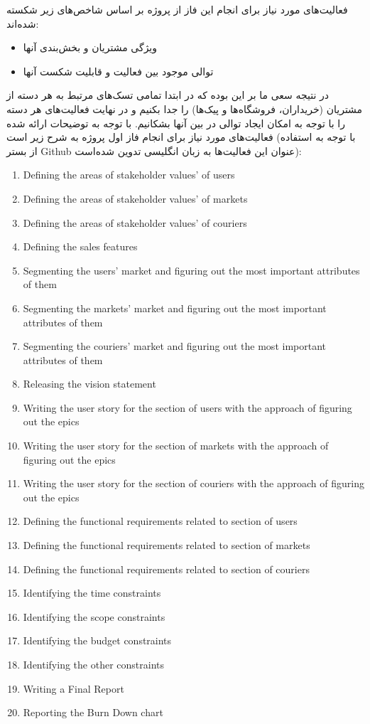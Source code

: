 \documentclass[]{article}
\begin{document}
فعالیت‌های مورد نیاز برای انجام این فاز از پروژه بر اساس شاخص‌های زیر
شکسته شده‌اند:

\begin{itemize}
\item
  ویژگی مشتریان و بخش‌بندی آنها
\item
  توالی موجود بین فعالیت و قابلیت شکست آنها
\end{itemize}

در نتیجه سعی ما بر این بوده که در ابتدا تمامی تسک‌های مرتبط به هر دسته
از مشتریان (خریداران، فروشگاه‌ها و پیک‌ها) را جدا بکنیم و در نهایت
فعالیت‌های هر دسته را با توجه به امکان ایجاد توالی در بین آنها بشکانیم.
با توجه به توضیحات ارائه شده فعالیت‌های مورد نیاز برای انجام فاز اول
پروژه به شرح زیر است (با توجه به استفاده از بستر Github عنوان این
فعالیت‌ها به زبان انگلیسی تدوین شده‌است):

\begin{enumerate}
\def\labelenumi{\arabic{enumi})}
\item
  Defining the areas of stakeholder values' of users
\item
  Defining the areas of stakeholder values' of markets
\item
  Defining the areas of stakeholder values' of couriers
\item
  Defining the sales features
\item
  Segmenting the users' market and figuring out the most important
  attributes of them
\item
  Segmenting the markets' market and figuring out the most important
  attributes of them
\item
  Segmenting the couriers' market and figuring out the most important
  attributes of them
\item
  Releasing the vision statement
\item
  Writing the user story for the section of users with the approach of
  figuring out the epics
\item
  Writing the user story for the section of markets with the approach of
  figuring out the epics
\item
  Writing the user story for the section of couriers with the approach
  of figuring out the epics
\item
  Defining the functional requirements related to section of users
\item
  Defining the functional requirements related to section of markets
\item
  Defining the functional requirements related to section of couriers
\item
  Identifying the time constraints
\item
  Identifying the scope constraints
\item
  Identifying the budget constraints
\item
  Identifying the other constraints
\item
  Writing a Final Report
\item
  Reporting the Burn Down chart
\end{enumerate}
\end{document}
